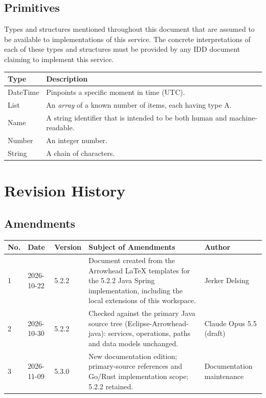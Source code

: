 \documentclass[a4paper]{arrowhead}
\newcommand{\pdef}[1]{{\textcolor{ArrowheadGrey}{#1\label{sec:model:primitives:#1}\label{sec:model:primitives:#1s}\label{sec:model:primitives:#1es}}}}
\begin{document}
\subsection{Primitives}
\label{sec:model:primitives}

Types and structures mentioned throughout this document that are assumed to be available to implementations of this service.
The concrete interpretations of each of these types and structures must be provided by any IDD document claiming to implement this service.

\noindent\begin{tabularx}{\textwidth}{| p{4.6cm} | X |} \hline
\rowcolor{gray!33} Type & Description \\ \hline
\pdef{DateTime} & Pinpoints a specific moment in time (UTC). \\ \hline
\pdef{List} & An \textit{array} of a known number of items, each having type A. \\ \hline
\pdef{Name} & A string identifier that is intended to be both human and machine-readable. \\ \hline
\pdef{Number} & An integer number. \\ \hline
\pdef{String} & A chain of characters. \\ \hline
\end{tabularx}

\newpage




\newpage

\section{Revision History}
\subsection{Amendments}

\noindent\begin{tabularx}{\textwidth}{| p{1cm} | p{3cm} | p{2cm} | X | p{4cm} |} \hline
\rowcolor{gray!33} No. & Date & Version & Subject of Amendments & Author \\ \hline

1 & 2026-10-22 & 5.2.2 & Document created from the Arrowhead LaTeX templates for the 5.2.2 Java Spring implementation, including the local extensions of this workspace. & Jerker Delsing \\ \hline
2 & 2026-10-30 & 5.2.2 & Checked against the primary Java source tree (Eclipse-Arrowhead-java): services, operations, paths and data models unchanged. & Claude Opus 5.5 (draft) \\ \hline
3 & 2026-11-09 & 5.3.0 & New documentation edition; primary-source references and Go/Rust implementation scope; 5.2.2 retained. & Documentation maintenance \\ \hline
\end{tabularx}
\end{document}
